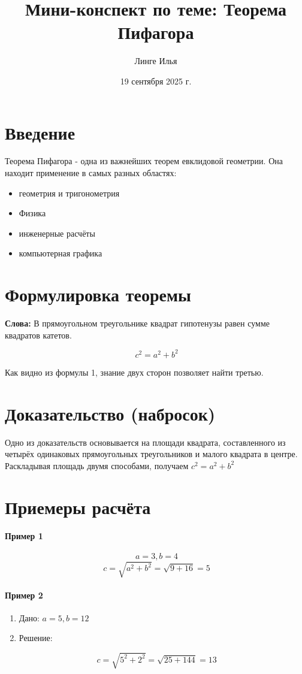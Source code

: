 \documentclass{article}
\title{Мини-конспект по теме: Теорема Пифагора}
\author{Линге Илья}
\date{19 сентября 2025 г.}
\begin{document}
\maketitle


\tableofcontents{}
\newpage{}
\section{Введение} 

\item Теорема Пифагора - одна из важнейших теорем евклидовой геометрии. Она находит применение в самых разных областях:
\begin{itemize}
    \item геометрия и тригонометрия
    \item Физика
    \item инженерные расчёты
    \item компьютерная графика
\end{itemize}
\section{Формулировка теоремы}

\textbf{Слова:} В прямоугольном треугольнике квадрат гипотенузы равен сумме квадратов катетов.
\begin{center}
\[
\ c^2 = a^2 + b^2
\]
\item Как видно из формулы 1, знание двух сторон позволяет найти третью.
\section{Доказательство (набросок)}

\item Одно из доказательств основывается на площади квадрата, составленного из четырёх одинаковых прямоугольных треугольников и малого квадрата в центре. Раскладывая площадь двумя способами, получаем $c^2 = a^2 + b^2$
\end{center}
\section{Приемеры расчёта}
\paragraph{Пример 1}
\[
\ a = 3, b = 4
\]
\[
\ c = \sqrt{a^2 + b ^2} = \sqrt{9 + 16} = 5
\]
\paragraph{Пример 2}
\begin{enumerate}
    \item  Дано: $a = 5, b = 12$
    \item Решение:
\end{enumerate}
\[
\ c = \sqrt{5^2 + 2^2} = \sqrt{25 + 144} = 13
\]
\end{document}
